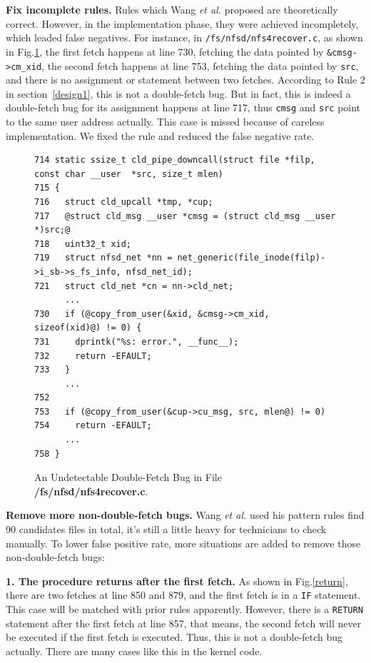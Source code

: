 \documentclass[10pt]{llncs}
\begin{document}
\textbf{Fix incomplete rules.}
Rules which Wang \textit{et al.} proposed are theoretically correct. However, in the implementation phase, they were achieved incompletely, which leaded false negatives. For instance, in \verb:/fs/nfsd/nfs4recover.c:, as shown in Fig.\ref{fix}, the first fetch happens at line 730, fetching the data pointed by \verb:&cmsg->cm_xid:, the second fetch happens at line 753, fetching the data pointed by \verb:src:, and there is no assignment or statement between two fetches. According to Rule 2 in section~\ref{design1}, this is not a double-fetch bug. But in fact, this is indeed a double-fetch bug for its assignment happens at line 717, thus \verb:cmsg: and \verb:src: point to the same user address actually. This case is missed because of careless implementation. We fixed the rule and reduced the false negative rate.

\begin{figure}[t]
  \centering
\begin{lstlisting}[style=code]
714 static ssize_t cld_pipe_downcall(struct file *filp, const char __user  *src, size_t mlen)
715 {
716   struct cld_upcall *tmp, *cup;
717   @struct cld_msg __user *cmsg = (struct cld_msg __user *)src;@
718   uint32_t xid;
719   struct nfsd_net *nn = net_generic(file_inode(filp)->i_sb->s_fs_info, nfsd_net_id);
721   struct cld_net *cn = nn->cld_net;
	  ...
730   if (@copy_from_user(&xid, &cmsg->cm_xid, sizeof(xid)@) != 0) {
731     dprintk("%s: error.", __func__);
732     return -EFAULT;
733   }
	  ...
752 
753   if (@copy_from_user(&cup->cu_msg, src, mlen@) != 0)
754     return -EFAULT;
	  ...
758 }
\end{lstlisting}
  \caption{An Undetectable Double-Fetch Bug in File \textbf{/fs/nfsd/nfs4recover.c}.}
  \label{fix}
\end{figure}


\textbf{Remove more non-double-fetch bugs.}
Wang \textit{et al.} used his pattern rules find 90 candidates files in total, it's still a little heavy for technicians to check manually. To lower false positive rate, more situations are added to remove those non-double-fetch bugs:

\textbf{1. The procedure returns after the first fetch.}
As shown in Fig.\ref{return}, there are two fetches at line 850 and 879, and the first fetch is in a \verb:IF: statement. This case will be matched with prior rules apparently. However, there is a \verb:RETURN: statement after the first fetch at line 857, that means, the second fetch will never be executed if the first fetch is executed. Thus, this is not a double-fetch bug actually. There are many cases like this in the kernel code.
\end{document}
